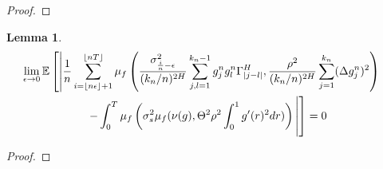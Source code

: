 \documentclass[12pt,letterpaper]{article}
\newtheorem{lemma}{Lemma}
\theoremstyle{definition}
\newcommand{\E}{\mathbb{E}}
\begin{document}
\begin{proof}
\end{proof}

\begin{lemma}
  \begin{align}
    \phantom{}
    &\begin{aligned}
      \mathllap{} &\lim_{\epsilon \rightarrow 0}\E\left[ \left| \frac{1}{n}\sum_{i = \left\lfloor n\epsilon \right\rfloor + 1}^{\left\lfloor nT \right\rfloor}\mu_f\left( \frac{\sigma^2_{\frac{i}{n}-\epsilon}}{(k_n/n)^{2H}}\sum_{j,l = 1}^{k_n-1} g^n_jg^n_l\Gamma^H_{|j-l|}, \frac{\rho^2}{(k_n/n)^{2H}}\sum_{j=1}^{k_n}(\Delta g^n_j)^2 \right) \right.\right. \\
                  &\hspace*{2cm} \left.\left. - \int_0^T\mu_f\left(\sigma_{s}^2\mu_f(\nu(g), \Theta^2\rho^2\int_0^1g'(r)^2dr)\right) \vphantom{\E\left[ \left| \frac{1}{n}\sum_{i = \left\lfloor n\epsilon \right\rfloor + 1}^{\left\lfloor nT \right\rfloor}\mu_f\left( \frac{\sigma^2_{\frac{i}{n}-\epsilon}}{(k_n/n)^{2H}}\sum_{j,l = 1}^{k_n-1} g^n_jg^n_l\Gamma^H_{|j-l|}, \frac{\rho^2}{(k_n/n)^{2H}}\sum_{j=1}^{k_n}(\Delta g^n_j)^2 \right) \right.\right.} \right|\right] = 0
      \end{aligned}
  \end{align}
\end{lemma}

\begin{proof}
\end{proof}
\end{document}
